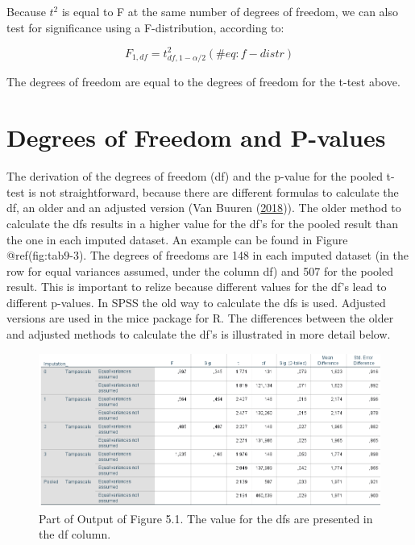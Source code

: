 \documentclass[
]{book}
\begin{document}
Because \(t^2\) is equal to F at the same number of degrees of freedom,
we can also test for significance using a F-distribution, according to:

\begin{equation}
F_{1, df}=t^2_{df,1-\alpha/2}
  (\#eq:f-distr)
\end{equation}

The degrees of freedom are equal to the degrees of freedom for the
t-test above.

\hypertarget{degrees-of-freedom-and-p-values}{%
\section{Degrees of Freedom and
P-values}\label{degrees-of-freedom-and-p-values}}

The derivation of the degrees of freedom (df) and the p-value for the
pooled t-test is not straightforward, because there are different
formulas to calculate the df, an older and an adjusted version (Van
Buuren (\protect\hyperlink{ref-VanBuuren2018}{2018})). The older method
to calculate the dfs results in a higher value for the df's for the
pooled result than the one in each imputed dataset. An example can be
found in Figure @ref(fig:tab9-3). The degrees of freedoms are 148 in
each imputed dataset (in the row for equal variances assumed, under the
column df) and 507 for the pooled result. This is important to relize
because different values for the df's lead to different p-values. In
SPSS the old way to calculate the dfs is used. Adjusted versions are
used in the mice package for R. The differences between the older and
adjusted methods to calculate the df's is illustrated in more detail
below.

\begin{figure}

{\centering \includegraphics[width=0.9\linewidth]{images/table5.2} 

}

\caption{Part of Output of Figure 5.1. The value for the dfs are presented in the df column.}\label{fig:tab9-3}
\end{figure}
\end{document}
